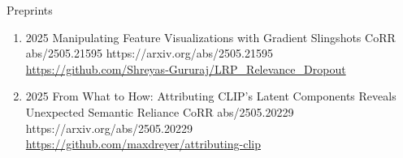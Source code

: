 \headedsubsection %
{Preprints}{}
{
    \begin{enumerate}
    
    
    
    
        
    
    
    
        \item {}
                        {2025}
                        {Manipulating Feature Visualizations with Gradient Slingshots}
                        {CoRR abs/2505.21595}
                        {https://arxiv.org/abs/2505.21595}
                        {
                            \\\href{https://github.com/Shreyas-Gururaj/LRP_Relevance_Dropout}{https://github.com/Shreyas-Gururaj/LRP\_Relevance\_Dropout}
                        }
                        
        \item {}
                        {2025}
                        {From What to How: Attributing CLIP's Latent Components Reveals Unexpected Semantic Reliance}
                        {CoRR abs/2505.20229}
                        {https://arxiv.org/abs/2505.20229}
                        {
                            \\\href{https://github.com/maxdreyer/attributing-clip}{https://github.com/maxdreyer/attributing-clip}
                        }
             

\end{enumerate}}
